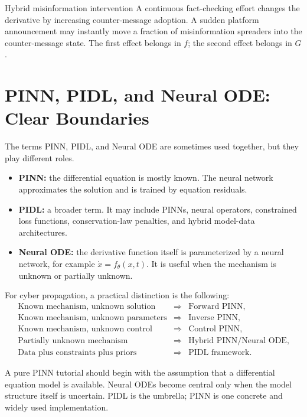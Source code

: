 \documentclass[11pt,a4paper]{article}
\begin{document}
\begin{examplebox}{Hybrid misinformation intervention}
A continuous fact-checking effort changes the derivative by increasing counter-message adoption. A sudden platform announcement may instantly move a fraction of misinformation spreaders into the counter-message state. The first effect belongs in $f$; the second effect belongs in $G$.
\end{examplebox}


\section{PINN, PIDL, and Neural ODE: Clear Boundaries}

The terms PINN, PIDL, and Neural ODE are sometimes used together, but they play different roles.
\begin{itemize}[leftmargin=2em]
    \item \textbf{PINN:} the differential equation is mostly known. The neural network approximates the solution and is trained by equation residuals.
    \item \textbf{PIDL:} a broader term. It may include PINNs, neural operators, constrained loss functions, conservation-law penalties, and hybrid model-data architectures.
    \item \textbf{Neural ODE:} the derivative function itself is parameterized by a neural network, for example $\dot{x}=f_\theta(x,t)$. It is useful when the mechanism is unknown or partially unknown.
\end{itemize}

For cyber propagation, a practical distinction is the following:
\begin{equation}
\begin{array}{lll}
\text{Known mechanism, unknown solution} & \Rightarrow & \text{Forward PINN},\\
\text{Known mechanism, unknown parameters} & \Rightarrow & \text{Inverse PINN},\\
\text{Known mechanism, unknown control} & \Rightarrow & \text{Control PINN},\\
\text{Partially unknown mechanism} & \Rightarrow & \text{Hybrid PINN/Neural ODE},\\
\text{Data plus constraints plus priors} & \Rightarrow & \text{PIDL framework}.
\end{array}
\end{equation}

\begin{takeaway}
A pure PINN tutorial should begin with the assumption that a differential equation model is available. Neural ODEs become central only when the model structure itself is uncertain. PIDL is the umbrella; PINN is one concrete and widely used implementation.
\end{takeaway}
\end{document}
